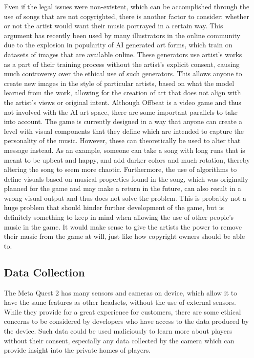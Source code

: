 \documentclass[10pt,twocolumn]{article}
\begin{document}
Even if the legal issues were non-existent, which can be accomplished through the use of songs that are not copyrighted, there is another factor to consider: whether or not the artist would want their music portrayed in a certain way. This argument has recently been used by many illustrators in the online community due to the explosion in popularity of AI generated art forms, which train on datasets of images that are available online. These generators use artist's works as a part of their training process without the artist's explicit consent, causing much controversy over the ethical use of such generators. This allows anyone to create new images in the style of particular artists, based on what the model learned from the work, allowing for the creation of art that does not align with the artist's views or original intent\cite{AIArtEthics}. Although Offbeat is a video game and thus not involved with the AI art space, there are some important parallels to take into account. The game is currently designed in a way that anyone can create a level with visual components that they define which are intended to capture the personality of the music. However, these can theoretically be used to alter that message instead. As an example, someone can take a song with long runs that is meant to be upbeat and happy, and add darker colors and much rotation, thereby altering the song to seem more chaotic. Furthermore, the use of algorithms to define visuals based on musical properties found in the song, which was originally planned for the game and may make a return in the future, can also result in a wrong visual output and thus does not solve the problem. This is probably not a huge problem that should hinder further development of the game, but is definitely something to keep in mind when allowing the use of other people's music in the game. It would make sense to give the artists the power to remove their music from the game at will, just like how copyright owners should be able to.

\subsection{Data Collection}
The Meta Quest 2 has many sensors and cameras on device, which allow it to have the same features as other headsets, without the use of external sensors. While they provide for a great experience for customers, there are some ethical concerns to be considered by developers who have access to the data produced by the device. Such data could be used maliciously to learn more about players without their consent, especially any data collected by the camera which can provide insight into the private homes of players.
\end{document}
